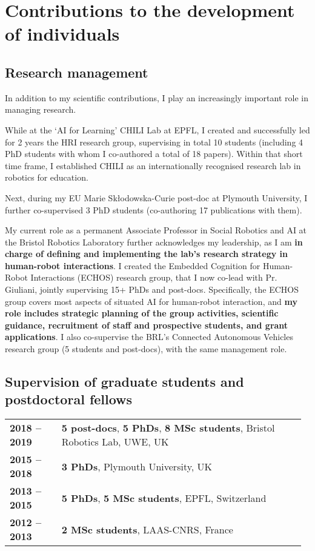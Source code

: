 \vspace{2em}
\section{Contributions to the development of individuals}

\subsection{Research management}

In addition to my scientific contributions, I play an increasingly
important role in managing research.

While at the `AI for Learning' CHILI Lab at EPFL, I created and successfully
led for 2 years the HRI research group, supervising in total
10 students (including 4 PhD students with whom I co-authored a total of 18
papers). Within that short time frame, I established CHILI as an internationally
recognised research lab in robotics for education. 

Next, during my EU Marie Skłodowska-Curie post-doc at Plymouth University, I
further co-supervised 3 PhD students (co-authoring 17 publications with them).

My current role as a permanent Associate Professor in Social Robotics and AI at
the Bristol Robotics Laboratory further acknowledges my leadership, as I am
\textbf{in charge of defining and implementing the lab's research strategy in
human-robot interactions}. I created the Embedded Cognition for Human-Robot
Interactions (ECHOS) research group, that I now co-lead with Pr. Giuliani,
jointly supervising 15+ PhDs and post-docs. Specifically, the ECHOS group covers most
aspects of situated AI for human-robot interaction, and \textbf{my role includes
strategic planning of the group activities, scientific guidance, recruitment of
staff and prospective students, and grant applications}. I also co-supervise
the BRL's Connected Autonomous Vehicles research group (5 students and
post-docs), with the same management role.

\subsection{Supervision of graduate students and postdoctoral fellows}

\begin{tabular}{p{0.17\linewidth}p{0.8\linewidth}}
    \bf 2018 -- 2019 & \textbf{5 post-docs}, \textbf{5 PhDs}, \textbf{8 MSc students}, Bristol Robotics Lab, UWE, UK \\
    \bf 2015 -- 2018 & \textbf{3 PhDs}, Plymouth University, UK \\
    \bf 2013 -- 2015 & \textbf{5 PhDs}, \textbf{5 MSc students}, EPFL, Switzerland \\
    \bf 2012 -- 2013 & \textbf{2 MSc students}, LAAS-CNRS, France \\
\end{tabular}


